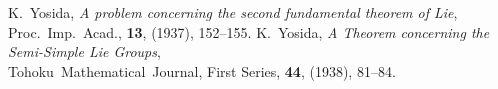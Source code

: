  K.~Yosida, \textit{A problem concerning the second fundamental theorem of Lie}, Proc.~Imp.~Acad., \textbf{13}, (1937), 152--155.
 K.~Yosida, \textit{A Theorem concerning the Semi-Simple Lie Groups}, \\Tohoku~Mathematical~Journal, First Series, \textbf{44}, (1938), 81--84.

